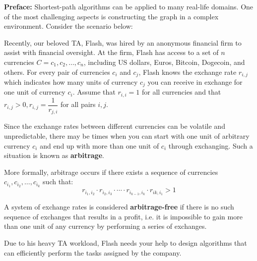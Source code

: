 
\textbf{Preface:} Shortest-path algorithms can be applied to many real-life domains. One of the most challenging aspects is constructing the graph in a complex environment. Consider the scenario below:

Recently, our beloved TA, Flash, was hired by an anonymous financial firm to assist with financial oversight. At the firm, Flash has access to a set of $n$ currencies $C = {c_1, c_2, \dots, c_n}$, including US dollars, Euros, Bitcoin, Dogecoin, and others. For every pair of currencies $c_i$ and $c_j$, Flash knows the exchange rate $r_{i,j}$ which indicates how many units of currency $c_j$ you can receive in exchange for one unit of currency $c_i$. Assume that $r_{i, i} = 1$ for all currencies and that $r_{i, j} > 0, r_{i,j} = \dfrac{1}{r_{j,i}}$ for all pairs $i, j$.

Since the exchange rates between different currencies can be volatile and unpredictable, there may be times when you can start with one unit of arbitrary currency $c_i$ and end up with more than one unit of $c_i$ through exchanging. Such a situation is known as \textbf{arbitrage}.

More formally, arbitrage occurs if there exists a sequence of currencies $c_{i_1}, c_{i_2}, \dots, c_{i_k}$ such that:
$$ r_{i_1, i_2} \cdot r_{i_2, i_3} \cdot \cdots \cdot r_{i_{k-1}, i_k} \cdot r_{ik, i_1} > 1 $$

A system of exchange rates is considered \textbf{arbitrage-free} if there is no such sequence of exchanges that results in a profit, i.e. it is impossible to gain more than one unit of any currency by performing a series of exchanges.

Due to his heavy TA workload, Flash needs your help to design algorithms that can efficiently perform the tasks assigned by the company.

